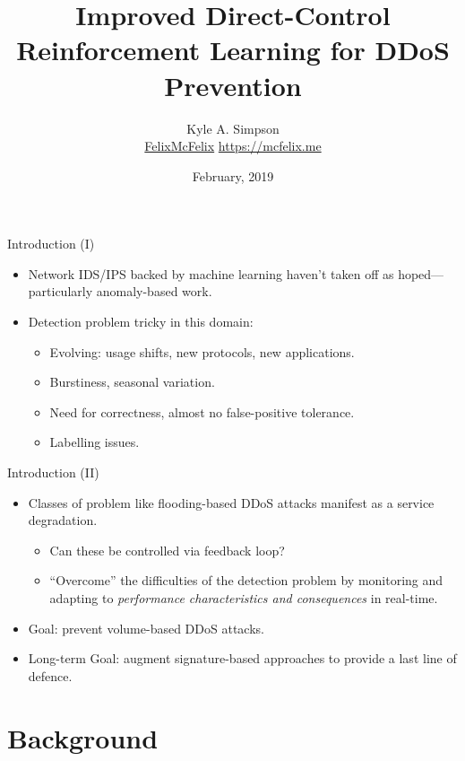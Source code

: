 \documentclass[aspectratio=169,xcolor={dvipsnames}
,hide notes
]{beamer}
\title{Improved Direct-Control Reinforcement Learning for DDoS Prevention}
\author{Kyle A. Simpson\\
	\small{\faGithub{} \href{https://github.com/felixmcfelix}{FelixMcFelix} \hspace{0.5em} \faGlobe{} \url{https://mcfelix.me}}}
\institute{University of Glasgow}
\date{\nth{5} February, 2019}
\begin{document}
\maketitle

\begin{frame}{Introduction (I)}
	\begin{itemize}
		\item Network IDS/IPS backed by machine learning haven't taken off as hoped---particularly anomaly-based work.
		\item Detection problem tricky in this domain:
		\begin{itemize}
			\item Evolving: usage shifts, new protocols, new applications.
			\item Burstiness, seasonal variation.
			\item Need for correctness, almost no false-positive tolerance.
			\item Labelling issues.
		\end{itemize}
	\end{itemize}
\end{frame}

\begin{frame}{Introduction (II)}
\begin{itemize}
	\item Classes of problem like flooding-based DDoS attacks manifest as a service degradation.
	\begin{itemize}
		\item Can these be controlled via feedback loop?
		\item \alert{``Overcome'' the difficulties of the detection problem} by monitoring and adapting to \emph{performance characteristics and consequences} in real-time.
	\end{itemize}
	\item Goal: prevent volume-based DDoS attacks.
	\item Long-term Goal: augment signature-based approaches to provide a last line of defence.
\end{itemize}
\end{frame}

\section{Background}
\end{document}

